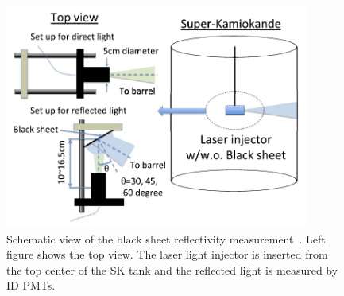 \begin{figure}[tbp]
	\centering
	\includegraphics[width=10cm]{Figures/Calibration/CalibBS}
	\caption[Schematic view of the black sheet reflectivity measurement]{\label{Calibration_CalibBS} Schematic view of the black sheet reflectivity measurement~\cite{2014AbeCalib}. Left figure shows the top view. The laser light injector is inserted from the top center of the SK tank and the reflected light is measured by ID PMTs.}
\end{figure}

\newpage
